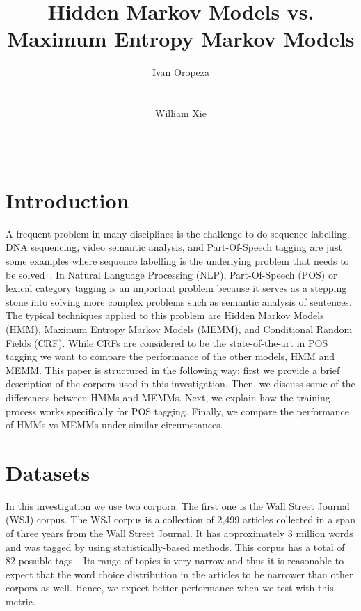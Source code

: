 \documentclass{acm_proc_article-sp}
\begin{document}
\author{
\alignauthor
Ivan Oropeza\\
       \\
       \\
\alignauthor
William Xie\\
       \\
       \\
}

\title{Hidden Markov Models vs. Maximum Entropy Markov Models}


\maketitle
\section{Introduction}
A frequent problem in many disciplines is the challenge to do sequence labelling. DNA sequencing, video semantic analysis, and Part-Of-Speech tagging are just some examples where sequence labelling is the underlying problem that needs to be solved~\cite{dnaEx, videoEx, nlpEx}. In Natural Language Processing (NLP), Part-Of-Speech (POS) or lexical category tagging is an important problem because it serves as a stepping stone into solving more complex problems such as semantic analysis of sentences. The typical techniques applied to this problem are Hidden Markov Models (HMM), Maximum Entropy Markov Models (MEMM), and Conditional Random Fields (CRF). While CRFs are considered to be the state-of-the-art in POS tagging we want to compare the performance of the other models, HMM and MEMM. This paper is structured in the following way: first we provide a brief description of the corpora used in this investigation. Then, we discuss some of the differences between HMMs and MEMMs. Next, we explain how the training process works specifically for POS tagging. Finally, we compare the performance of HMMs vs MEMMs under similar circumstances.

\section{Datasets}
In this investigation we use two corpora. The first one is the Wall Street Journal (WSJ) corpus. The WSJ corpus is a collection of 2,499 articles collected in a span of three years from the Wall Street Journal. It has approximately 3 million words and was tagged by using statistically-based methods. This corpus has a total of 82 possible tags~\cite{wsjCorpus}. Its range of topics is very narrow and thus it is reasonable to expect that the word choice distribution in the articles to be narrower than other corpora as well. Hence, we expect better performance when we test with this metric.
\end{document}
